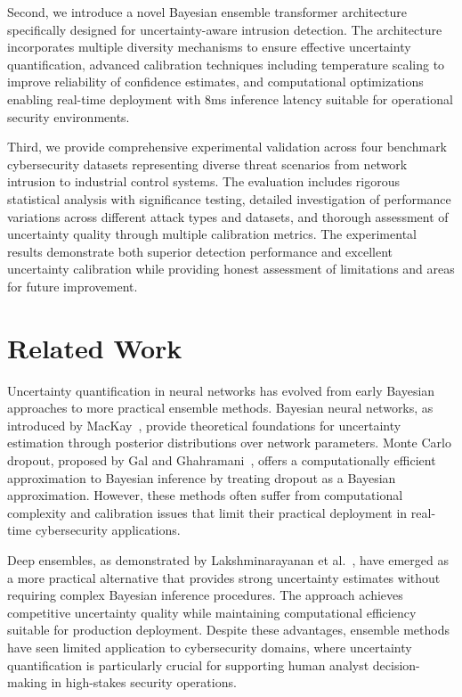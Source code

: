 \documentclass[journal]{IEEEtran}
\begin{document}
Second, we introduce a novel Bayesian ensemble transformer architecture specifically designed for uncertainty-aware intrusion detection. The architecture incorporates multiple diversity mechanisms to ensure effective uncertainty quantification, advanced calibration techniques including temperature scaling to improve reliability of confidence estimates, and computational optimizations enabling real-time deployment with 8ms inference latency suitable for operational security environments.

Third, we provide comprehensive experimental validation across four benchmark cybersecurity datasets representing diverse threat scenarios from network intrusion to industrial control systems. The evaluation includes rigorous statistical analysis with significance testing, detailed investigation of performance variations across different attack types and datasets, and thorough assessment of uncertainty quality through multiple calibration metrics. The experimental results demonstrate both superior detection performance and excellent uncertainty calibration while providing honest assessment of limitations and areas for future improvement.

\section{Related Work}

Uncertainty quantification in neural networks has evolved from early Bayesian approaches to more practical ensemble methods. Bayesian neural networks, as introduced by MacKay~\cite{mackay1992practical}, provide theoretical foundations for uncertainty estimation through posterior distributions over network parameters. Monte Carlo dropout, proposed by Gal and Ghahramani~\cite{gal2016dropout}, offers a computationally efficient approximation to Bayesian inference by treating dropout as a Bayesian approximation. However, these methods often suffer from computational complexity and calibration issues that limit their practical deployment in real-time cybersecurity applications.

Deep ensembles, as demonstrated by Lakshminarayanan et al.~\cite{lakshminarayanan2017simple}, have emerged as a more practical alternative that provides strong uncertainty estimates without requiring complex Bayesian inference procedures. The approach achieves competitive uncertainty quality while maintaining computational efficiency suitable for production deployment. Despite these advantages, ensemble methods have seen limited application to cybersecurity domains, where uncertainty quantification is particularly crucial for supporting human analyst decision-making in high-stakes security operations.
\end{document}
